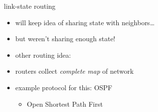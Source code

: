 
\begin{frame}{link-state routing}
    \begin{itemize}
    \item will keep idea of sharing state with neighbors\ldots
    \item but weren't sharing enough state!
    \vspace{.5cm}
    \item other routing idea: 
    \item routers collect \textit{complete map} of network
    \item example protocol for this: OSPF
        \begin{itemize}
        \item Open Shortest Path First
        \end{itemize}
    \end{itemize}
\end{frame}

